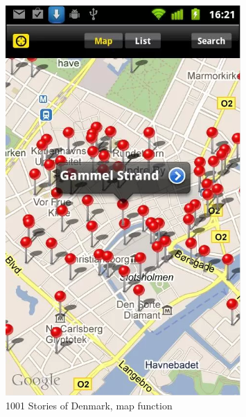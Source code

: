 \documentclass[11pt]{book}
\begin{document}
\begin{figure}[H]
      \centering
      \includegraphics[width=0.8\textwidth]{Figures/Prestudy/1001storiesMap.png}
      \caption{1001 Stories of Denmark, map function}
      \label{fig:pre_1001StoriesDenmarkAppMap}
\end{figure}
\end{document}
